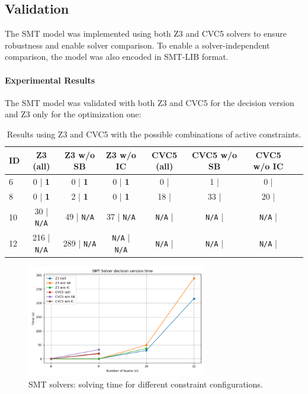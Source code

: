 \documentclass[11pt]{article}
\begin{document}
\subsection{Validation}

The SMT model was implemented using both Z3 and CVC5 solvers to ensure robustness and enable solver comparison. To enable a solver-independent comparison, the model was also encoded in SMT-LIB format.

\paragraph{Experimental Results}

The SMT model was validated with both Z3 and CVC5 for the decision version and Z3 only for the optimization one:

\begin{table}[H]
\centering
\small
\label{tab:smt}
\begin{tabular}{@{}lccccccc@{}}
\toprule
ID & Z3 (all) & Z3 w/o SB & Z3 w/o IC & CVC5 (all) & CVC5 w/o SB & CVC5 w/o IC \\
\midrule
6 & 0 | \textbf{1} & 0 | \textbf{1} & 0 | \textbf{1} &  0 | &  1 | &  0 |\\
8 & 0 | \textbf{1} & 2 | \textbf{1} & 0 | \textbf{1} & 18 | & 33 | & 20 |\\
10 &  30 | \texttt{N/A} &  49 | \texttt{N/A} &  37 | \texttt{N/A} & \texttt{N/A} | & \texttt{N/A} | & \texttt{N/A} |\\
12 &  216 | \texttt{N/A} &  289 | \texttt{N/A} & \texttt{N/A} | \texttt{N/A} & \texttt{N/A} | & \texttt{N/A} | & \texttt{N/A} |\\
\bottomrule
\end{tabular}
\caption{Results using Z3 and CVC5 with the possible combinations of active constraints.}
\end{table}

\begin{figure}[H]
    \centering
    \includegraphics[width=0.7\textwidth]{SMT_solvers.png}
    \caption{SMT solvers: solving time for different constraint configurations.}
    \label{fig:smt_plot}
\end{figure}
\end{document}

